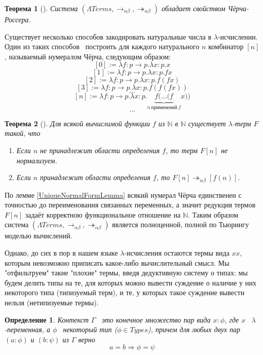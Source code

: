 \documentclass{article}[14pt]
\newtheorem{theorem}{Теорема}
\newtheorem{definition}{Определение}
\newcommand{\dash}{\textemdash\ }
\begin{document}
\begin{theorem}[\cite{SorUrz06}]
    Система $(\Lambda Terms, \rightarrow_{\alpha \beta}, \twoheadrightarrow_{\alpha \beta})$ обладает
    свойством Чёрча-Россера.
\end{theorem}

Существует несколько способов закодировать натуральные числа в $\lambda$-исчислении. Один из таких
способов \dash построить для каждого натурального $n$ комбинатор $[n]$, называемый нумералом Чёрча,
следующим образом:
$$[0] := \lambda f : p \rightarrow p . \lambda x : p . x$$
$$[1] := \lambda f : p \rightarrow p . \lambda x : p . fx$$
$$[2] := \lambda f : p \rightarrow p . \lambda x : p . f (fx)$$
$$[3] := \lambda f : p \rightarrow p . \lambda x : p . f (f (fx))$$
$$ \dots $$
$$[n] := \lambda f : p \rightarrow p. \lambda x : p . \underbrace{f(\dots (f}_{n\ \text{применений}\ f} x))$$
$$ \dots $$

\begin{theorem}[\cite{SorUrz06}]
    Для всякой вычислимой функции $f$ из $\mathbb{N}$ в $\mathbb{N}$ существует
    $\lambda$-терм $F$ такой, что
    \begin{enumerate}
        \item Если $n$ не принадлежит области определения $f$, то терм $F[n]$ не нормализуем.
        \item Если $n$ принадлежит области определения $f$, то $F[n] \twoheadrightarrow_{\alpha \beta} [f(n)]$.
    \end{enumerate}
\end{theorem}

По лемме \ref{UniqueNormalFormLemma} всякий нумерал Чёрча единственен с точностью до переименования
связанных переменных, а значит редукция термов $F[n]$ задаёт корректною функциональное отношение на
$\mathbb{N}$. Таким образом система $(\Lambda Terms, \rightarrow_{\alpha \beta}, \twoheadrightarrow_{\alpha \beta})$
является полноценной, полной по Тьюрингу моделью вычислений.

Однако, до сих в пор в нашем языке $\lambda$-исчисления остаются термы вида $xx$, которым невозможно приписать
какое-либо вычислительный смысл. Мы "отфильтруем" такие "плохие" термы, введя дедуктивную систему о типах:
мы будем делить типы на те, для которых можно вывести суждение о наличие у них некоторого типа (типизуемый терм),
и те, у которых такое суждение вывести нельзя (нетипизуемые термы).

\begin{definition}
    \label{ContextDefinition}
    Контекст $\Gamma$ \dash это конечное множество пар вида $x : \phi$, где $x$ \dash $\lambda$-переменная,
    а $\phi$ \dash некоторый тип ($\phi \in Types$), причем для любых двух пар $(a : \phi)$ и $(b : \psi)$ из
    $\Gamma$ верно
    $$a = b \Rightarrow \phi = \psi$$
\end{definition}
\end{document}
